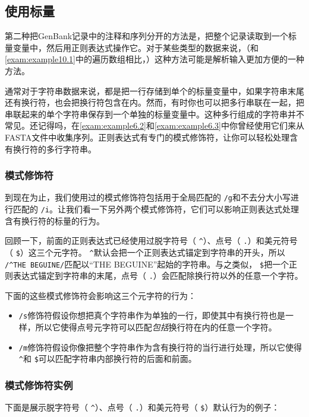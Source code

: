 \subsection{使用标量}
第二种把GenBank记录中的注释和序列分开的方法是，把整个记录读取到一个标量变量中，然后用正则表达式操作它。对于某些类型的数据来说，（和\autoref{exam:example10.1}中的遍历数组相比，）这种方法可能是解析输入更加方便的一种方法。

通常对于字符串数据来说，都是把一行存储到单个的标量变量中，如果字符串末尾还有换行符，也会把换行符包含在内。然而，有时你也可以把多行串联在一起，把串联起来的单个字符串保存到一个单独的标量变量中。这种多行组成的字符串并不常见。还记得吗，在\autoref{exam:example6.2}和\autoref{exam:example6.3}中你曾经使用它们来从FASTA文件中收集序列。正则表达式有专门的模式修饰符，让你可以轻松处理含有换行符的多行字符串。

\subsubsection{模式修饰符}
到现在为止，我们使用过的模式修饰符包括用于全局匹配的 \verb|/g|和不去分大小写进行匹配的 \verb|/i|。让我们看一下另外两个模式修饰符，它们可以影响正则表达式处理含有换行符的标量的行为。

回顾一下，前面的正则表达式已经使用过脱字符号（ \verb|^|）、点号（ \verb|.|）和美元符号（ \verb|$|）这三个元字符。 \verb|^|默认会把一个正则表达式锚定到字符串的开头，所以 \verb|/^THE BEGUINE/|匹配以“THE BEGUINE”起始的字符串。与之类似， \verb|$|把一个正则表达式锚定到字符串的末尾，点号（ \verb|.|）会匹配除换行符以外的任意一个字符。

下面的这些模式修饰符会影响这三个元字符的行为：

\begin{itemize}
  \item  \verb|/s|修饰符假设你想把真个字符串作为单独的一行，即使其中有换行符也是一样，所以它使得点号元字符可以匹配\textit{包括}换行符在内的任意一个字符。
  \item
     \verb|/m|修饰符假设你像把整个字符串作为含有换行符的当行进行处理，所以它使得 \verb|^|和 \verb|$|可以匹配字符串内部换行符的后面和前面。
\end{itemize}

\subsubsection{模式修饰符实例}
下面是展示脱字符号（ \verb|^|）、点号（ \verb|.|）和美元符号（ \verb|$|）默认行为的例子：

